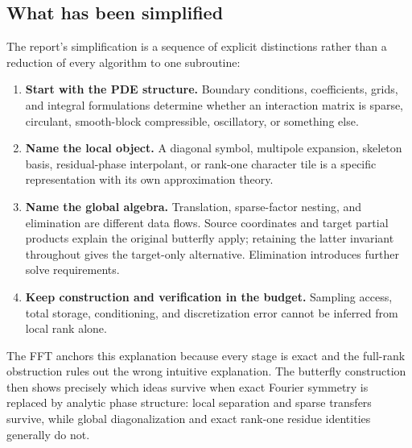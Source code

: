 \documentclass[11pt,a4paper]{article}
\begin{document}
\subsection{What has been simplified}
The report's simplification is a sequence of explicit distinctions rather than a reduction of every algorithm to one subroutine:
\begin{enumerate}
\item \textbf{Start with the PDE structure.} Boundary conditions, coefficients, grids, and integral formulations determine whether an interaction matrix is sparse, circulant, smooth-block compressible, oscillatory, or something else.
\item \textbf{Name the local object.} A diagonal symbol, multipole expansion, skeleton basis, residual-phase interpolant, or rank-one character tile is a specific representation with its own approximation theory.
\item \textbf{Name the global algebra.} Translation, sparse-factor nesting, and elimination are different data flows. Source coordinates and target partial products explain the original butterfly apply; retaining the latter invariant throughout gives the target-only alternative. Elimination introduces further solve requirements.
\item \textbf{Keep construction and verification in the budget.} Sampling access, total storage, conditioning, and discretization error cannot be inferred from local rank alone.
\end{enumerate}
The FFT anchors this explanation because every stage is exact and the full-rank obstruction rules out the wrong intuitive explanation. The butterfly construction then shows precisely which ideas survive when exact Fourier symmetry is replaced by analytic phase structure: local separation and sparse transfers survive, while global diagonalization and exact rank-one residue identities generally do not.
\end{document}
